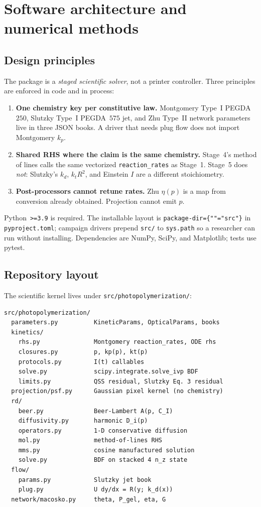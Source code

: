 \chapter{Software architecture and numerical methods}
\label{ch:methods}

\section{Design principles}

The package is a \emph{staged scientific solver}, not a printer controller.
Three principles are enforced in code and in process:

\begin{enumerate}
  \item \textbf{One chemistry key per constitutive law.}
    Montgomery Type~I PEGDA~$250$, Slutzky Type~I PEGDA~$575$ jet, and Zhu Type~II network parameters live in three JSON books.
    A driver that needs plug flow does not import Montgomery $k_p$.
  \item \textbf{Shared RHS where the claim is the same chemistry.}
    Stage~4's method of lines calls the same vectorized \texttt{reaction\_rates} as Stage~1.
    Stage~5 does \emph{not}: Slutzky's $k_d$, $k_t R^2$, and Einstein $I$ are a different stoichiometry.
  \item \textbf{Post-processors cannot retune rates.}
    Zhu $\eta(p)$ is a map from conversion already obtained.
    Projection cannot emit $p$.
\end{enumerate}

Python~\texttt{>=3.9} is required.
The installable layout is \texttt{package-dir=\{""="src"\}} in \texttt{pyproject.toml}; campaign drivers prepend \texttt{src/} to \texttt{sys.path} so a researcher can run without installing.
Dependencies are NumPy, SciPy, and Matplotlib; tests use pytest.

\section{Repository layout}

The scientific kernel lives under \texttt{src/photopolymerization/}:

\begin{verbatim}
src/photopolymerization/
  parameters.py          KineticParams, OpticalParams, books
  kinetics/
    rhs.py               Montgomery reaction_rates, ODE rhs
    closures.py          p, kp(p), kt(p)
    protocols.py         I(t) callables
    solve.py             scipy.integrate.solve_ivp BDF
    limits.py            QSS residual, Slutzky Eq. 3 residual
  projection/psf.py      Gaussian pixel kernel (no chemistry)
  rd/
    beer.py              Beer-Lambert A(p, C_I)
    diffusivity.py       harmonic D_i(p)
    operators.py         1-D conservative diffusion
    mol.py               method-of-lines RHS
    mms.py               cosine manufactured solution
    solve.py             BDF on stacked 4 n_z state
  flow/
    params.py            Slutzky jet book
    plug.py              U dy/dx = R(y; k_d(x))
  network/macosko.py     theta, P_gel, eta, G
\end{verbatim}

